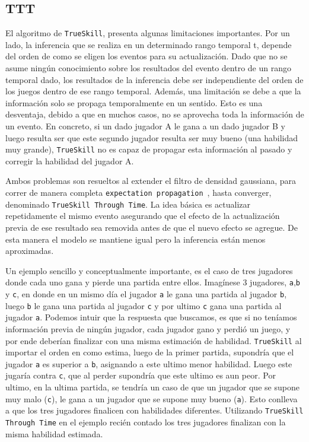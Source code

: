 \documentclass[11pt,twoside,spanish]{report} %
\begin{document}
\subsection{TTT}


El algoritmo de \texttt{TrueSkill}, presenta algunas limitaciones importantes.
Por un lado, la inferencia que se realiza en un determinado rango temporal t, depende del orden de como se eligen los eventos para su actualizaci\'on.
Dado que no se asume ning\'un conocimiento sobre los resultados del evento dentro de un rango temporal dado, los resultados de la inferencia debe ser independiente del orden de los juegos dentro de ese rango temporal.
Adem\'as, una limitaci\'on se debe a que la informaci\'on solo se propaga temporalmente en un sentido.
Esto es una desventaja, debido a que en muchos casos, no se aprovecha toda la informaci\'on de un evento.
En concreto, si un dado jugador A le gana a un dado jugador B y luego resulta ser que este segundo jugador resulta ser muy bueno (una habilidad muy grande), \texttt{TrueSkill} no es capaz de propagar esta informaci\'on al pasado y corregir la habilidad del jugador A.

Ambos problemas son resueltos al extender el filtro de densidad gaussiana, para correr de manera completa \texttt{expectation propagation}~\cite{herbrich2005}, hasta converger, denominado \texttt{TrueSkill Through Time}.
La idea b\'asica es actualizar repetidamente el mismo evento asegurando que el efecto de la actualizaci\'on previa de ese resultado sea removida antes de que el nuevo efecto se agregue.
De esta manera el modelo se mantiene igual pero la inferencia est\'an menos aproximadas.

Un ejemplo sencillo y conceptualmente importante, es el caso de tres jugadores donde cada uno gana y pierde una partida entre ellos.
Imag\'inese 3 jugadores, \texttt{a},\texttt{b} y \texttt{c}, en donde en un mismo d\'ia el jugador \texttt{a} le gana una partida al jugador \texttt{b}, luego \texttt{b} le gana una partida al jugador \texttt{c} y por ultimo \texttt{c} gana una partida al jugador \texttt{a}.
Podemos intuir que la respuesta que buscamos, es que si no ten\'iamos informaci\'on previa de ning\'un jugador, cada jugador gano y perdi\'o un juego, y por ende deber\'ian finalizar con una misma estimaci\'on de habilidad.
\texttt{TrueSkill} al importar el orden en como estima, luego de la primer partida, supondr\'ia que el jugador \texttt{a} es superior a \texttt{b}, asignando a este ultimo menor habilidad.
Luego este jugar\'ia contra \texttt{c}, que al perder supondr\'ia que este ultimo es aun peor.
Por ultimo, en la ultima partida, se tendr\'ia un caso de que un jugador que se supone muy malo (\texttt{c}), le gana a un jugador que se supone muy bueno (\texttt{a}).
Esto conlleva a que los tres jugadores finalicen con habilidades diferentes.
Utilizando \texttt{TrueSkill Through Time} en el ejemplo reci\'en contado los tres jugadores finalizan con la misma habilidad estimada.
\end{document}
